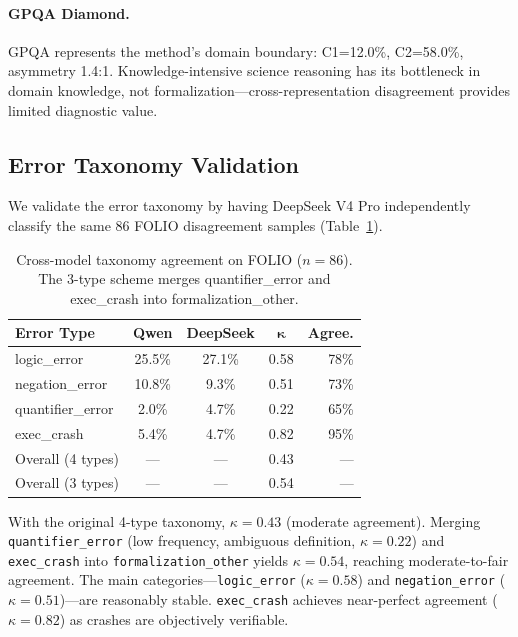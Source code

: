 \documentclass[11pt,a4paper]{article}
\begin{document}
\paragraph{GPQA Diamond.}
GPQA represents the method's domain boundary: C1=12.0\%, C2=58.0\%, asymmetry 1.4:1.
Knowledge-intensive science reasoning has its bottleneck in domain knowledge, not formalization---cross-representation disagreement provides limited diagnostic value.

\subsection{Error Taxonomy Validation}
\label{sec:taxonomy-validation}

We validate the error taxonomy by having DeepSeek V4 Pro independently classify the same 86 FOLIO disagreement samples (Table~\ref{tab:taxonomy}).

\begin{table}[t]
\centering
\small
\begin{tabular}{lcccr}
\toprule
\textbf{Error Type} & \textbf{Qwen} & \textbf{DeepSeek} & $\boldsymbol{\kappa}$ & \textbf{Agree.} \\
\midrule
logic\_error & 25.5\% & 27.1\% & 0.58 & 78\% \\
negation\_error & 10.8\% & 9.3\% & 0.51 & 73\% \\
quantifier\_error & 2.0\% & 4.7\% & 0.22 & 65\% \\
exec\_crash & 5.4\% & 4.7\% & 0.82 & 95\% \\
\midrule
Overall (4 types) & --- & --- & 0.43 & --- \\
Overall (3 types) & --- & --- & 0.54 & --- \\
\bottomrule
\end{tabular}
\caption{Cross-model taxonomy agreement on FOLIO ($n{=}86$). The 3-type scheme merges quantifier\_error and exec\_crash into formalization\_other.}
\label{tab:taxonomy}
\end{table}

With the original 4-type taxonomy, $\kappa{=}0.43$ (moderate agreement).
Merging \texttt{quantifier\_error} (low frequency, ambiguous definition, $\kappa{=}0.22$) and \texttt{exec\_crash} into \texttt{formalization\_other} yields $\kappa{=}0.54$, reaching moderate-to-fair agreement.
The main categories---\texttt{logic\_error} ($\kappa{=}0.58$) and \texttt{negation\_error} ($\kappa{=}0.51$)---are reasonably stable.
\texttt{exec\_crash} achieves near-perfect agreement ($\kappa{=}0.82$) as crashes are objectively verifiable.
\end{document}
